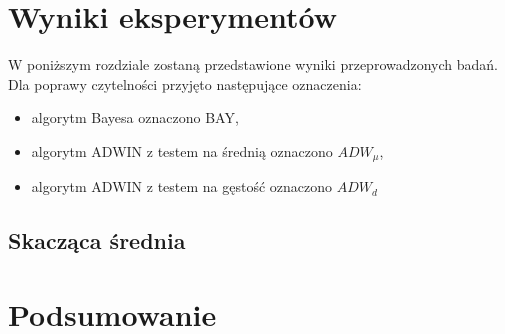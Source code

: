 \section{Wyniki eksperymentów}
W poniższym rozdziale zostaną przedstawione wyniki przeprowadzonych badań.
Dla poprawy czytelności przyjęto następujące oznaczenia:
\begin{itemize}
  \item algorytm Bayesa oznaczono BAY,
  \item algorytm ADWIN z testem na średnią oznaczono $ADW_{\mu}$,
  \item algorytm ADWIN z testem na gęstość oznaczono $ADW_{d}$
\end{itemize}

\subsection{Skacząca średnia}

\newpage


\section{Podsumowanie}

